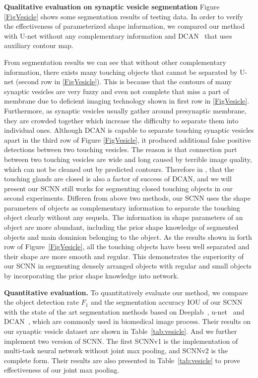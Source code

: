 \noindent\textbf{Qualitative evaluation on synaptic vesicle segmentation}
Figure \ref{FigVesicle} shows some segmentation results of testing data.
In order to verify the effectiveness of parameterized shape information, we compared our method with U-net \cite{Ronneberger2015} without any complementary information and DCAN~\cite{Chen2016a} that uses auxiliary contour map.

From segmentation results we can see that without other complementary information, there exists many touching objects that cannot be separated by U-net (second row in \ref{FigVesicle}).
This is because that the contours of many synaptic vesicles are very fuzzy and even not complete that miss a part of membrane due to deficient imaging technology shown in first row in \ref{FigVesicle}.
Furthermore, as synaptic vesicles usually gather around presynaptic membrane, they are crowded together which increase the difficulty to separate them into individual ones. 
Although DCAN is capable to separate touching synaptic vesicles apart in the third row of Figure \ref{FigVesicle}, it produced additional false positive detections between two touching vesicles.
The reason is that connection part between two touching vesicles are wide and long caused by terrible image quality, which can not be cleaned out by predicted contours.
Therefore in \cite{Chen2016a}, that the touching glands are closed is also a factor of success of DCAN, and we will present our SCNN still works for segmenting closed touching objects in our second experiments.  
Differen from above two methods, our SCNN uses the shape parameters of objects as complementary information to separate the touching object clearly without any sequela.
The information in shape parameters of an object are more abundant, including the prior shape knowledge of segmented objects and main dominion belonging to the object.
As the results shown in forth row of Figure~\ref{FigVesicle}, all the touching objects have been well separated and their shape are more smooth and regular.
This demonstrates the superiority of our SCNN in segmenting densely arranged objects with regular and small objects by incorporating the prior shape knowledge into network.

\noindent\textbf{Quantitative evaluation.}
To quantitatively evaluate our method, we compare the object detection rate $F_1$ and the segmentation accuracy IOU of our SCNN with the state of the art segmentation methods based on Deeplab~\cite{Chen2014a}, u-net~\cite{Ronneberger2015} and DCAN~\cite{Chen2016b}, which are commonly used in biomedical image process.
%
Their results on our synaptic vesicle dataset are shown in Table~\ref{tab:vesicle}.
%
And we further implement two version of SCNN.
The first SCNNv1 is the implementation of multi-task neural network without joint max pooling, and SCNNv2 is the complete form.
Their results are also presented in Table~\ref{tab:vesicle} to prove effectiveness of our joint max pooling.

